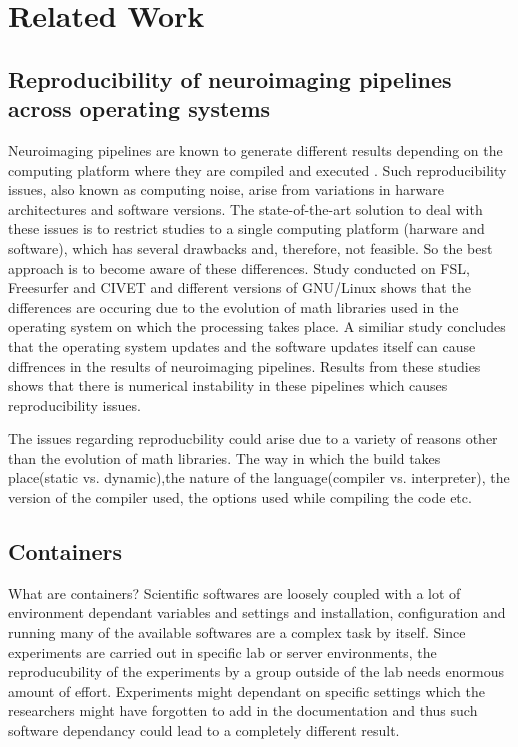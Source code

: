 \chapter{Related Work}

\section{Reproducibility of neuroimaging pipelines across operating systems}
Neuroimaging pipelines are known to generate different results depending on the computing platform where they are compiled and executed \cite{Gla15}. Such reproducibility issues, also known as computing noise, arise from variations in harware architectures and software versions. The state-of-the-art solution to deal with these issues is to restrict studies to a single computing platform (harware and software), which has several drawbacks and, therefore, not feasible. So the best approach is to become aware of these differences.
Study conducted on FSL, Freesurfer and CIVET and different versions of GNU/Linux \cite{Gla15} shows that the differences are occuring due to the evolution of math libraries used in the operating system on which the processing takes place. A similiar study \cite{10.1371/journal.pone.0038234} concludes that the operating system updates and the software updates itself can cause diffrences in the results of neuroimaging pipelines. Results from these studies shows that there is numerical instability in these pipelines which causes reproducibility issues.

The issues regarding reproducbility could arise due to a variety of reasons other than the evolution of math libraries. The way in which the build takes place(static vs. dynamic),the nature of the language(compiler vs. interpreter), the version of the compiler used, the options used while compiling the code etc. 

\section{Containers}
What are containers?
Scientific softwares are loosely coupled with a lot of environment dependant variables and settings and installation, configuration and running many of the available softwares are a complex task by itself. Since experiments are carried out in specific lab or server environments, the reproducubility of the experiments by a group outside of the lab needs enormous amount of effort. Experiments might dependant on specific settings which the researchers might have forgotten to add in the documentation and thus such software dependancy could lead to a completely different result. 


